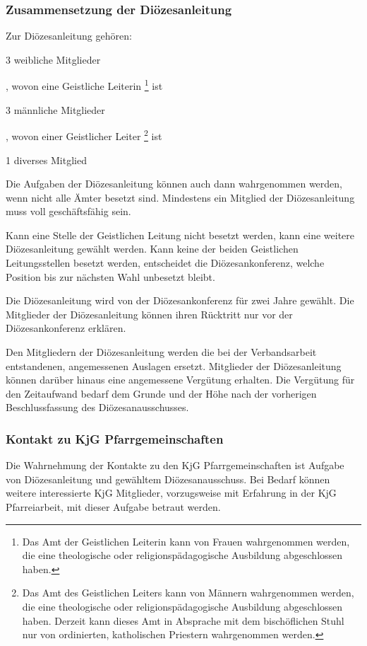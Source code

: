 \documentclass[12pt]{report}
\begin{document}
\begin{flushleft}
\subsubsection{Zusammensetzung der Diözesanleitung}
Zur Diözesanleitung gehören:
\begin{itemize}
  {\item 3 weibliche Mitglieder}, wovon eine Geistliche Leiterin 
       \footnote{
           Das Amt der Geistlichen Leiterin kann von Frauen wahrgenommen werden, die eine theologische
           oder religionspädagogische Ausbildung abgeschlossen haben.
       }
       ist
  {\item 3 männliche Mitglieder}, wovon einer Geistlicher Leiter
        \footnote{
            Das Amt des Geistlichen Leiters kann von Männern wahrgenommen werden, die eine theologische
            oder religionspädagogische Ausbildung abgeschlossen haben. Derzeit kann dieses Amt in Absprache
            mit dem bischöflichen Stuhl nur von ordinierten, katholischen Priestern wahrgenommen werden.	
        }
        ist
    {\item 1 diverses Mitglied}
\end{itemize}

Die Aufgaben der Diözesanleitung können auch dann wahrgenommen werden, wenn nicht alle
Ämter besetzt sind. Mindestens ein Mitglied der Diözesanleitung muss voll geschäftsfähig sein.

Kann eine Stelle der Geistlichen Leitung nicht besetzt werden, kann eine weitere Diözesanleitung
gewählt werden. Kann keine der beiden Geistlichen Leitungsstellen besetzt werden, entscheidet
die Diözesankonferenz, welche Position bis zur nächsten Wahl unbesetzt bleibt.

Die Diözesanleitung wird von der Diözesankonferenz für zwei Jahre gewählt. Die Mitglieder der
Diözesanleitung können ihren Rücktritt nur vor der Diözesankonferenz erklären.

Den Mitgliedern der Diözesanleitung werden die bei der Verbandsarbeit entstandenen, angemessenen Auslagen
ersetzt. Mitglieder der Diözesanleitung können darüber hinaus eine angemessene Vergütung erhalten.
Die Vergütung für den Zeitaufwand bedarf dem Grunde und der Höhe nach der vorherigen Beschlussfassung
des Diözesanausschusses.

\subsubsection{Kontakt zu KjG Pfarrgemeinschaften}
Die Wahrnehmung der Kontakte zu den KjG Pfarrgemeinschaften ist Aufgabe von Diözesanleitung
und gewähltem Diözesanausschuss. Bei Bedarf können weitere interessierte KjG Mitglieder,
vorzugsweise mit Erfahrung in der KjG Pfarreiarbeit, mit dieser Aufgabe betraut werden.


\end{flushleft}
\end{document}
